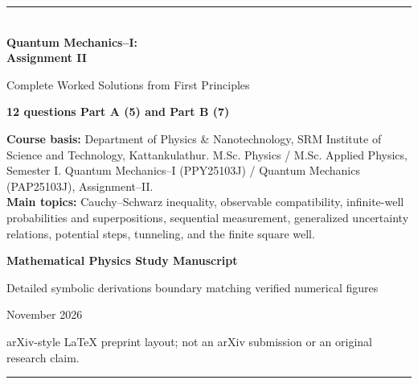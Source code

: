 \documentclass[11pt,a4paper]{article}
\begin{document}
\begin{titlepage}
\thispagestyle{empty}
\vspace*{17mm}
{\color{teal}\rule{\textwidth}{1.5pt}}\\[10mm]
{\sffamily\fontsize{29}{34}\selectfont\bfseries Quantum Mechanics--I:\\[2mm] Assignment II}\par
\vspace{6mm}
{\sffamily\Large Complete Worked Solutions from First Principles}\par
\vspace{11mm}
{\large\textbf{12 questions \textbullet{} Part A (5) and Part B (7)}}\par
\vspace{8mm}
\begin{tcolorbox}[colback=pale,colframe=teal]
\textbf{Course basis:} Department of Physics \& Nanotechnology, SRM Institute of Science and Technology, Kattankulathur. M.Sc. Physics / M.Sc. Applied Physics, Semester I. Quantum Mechanics--I (PPY25103J) / Quantum Mechanics (PAP25103J), Assignment--II.\\[4pt]
\textbf{Main topics:} Cauchy--Schwarz inequality, observable compatibility, infinite-well probabilities and superpositions, sequential measurement, generalized uncertainty relations, potential steps, tunneling, and the finite square well.
\end{tcolorbox}
\vspace{9mm}
{\Large\bfseries\color{navy} Mathematical Physics Study Manuscript}\par
\vspace{4mm}
{\normalsize Detailed symbolic derivations \textbullet{} boundary matching \textbullet{} verified numerical figures}\par
\vfill
{\large November 2026}\par
\vspace{3mm}
{\small arXiv-style \LaTeX{} preprint layout; not an arXiv submission or an original research claim.}\par
\vspace{8mm}
{\color{teal}\rule{\textwidth}{1.5pt}}
\end{titlepage}
\end{document}
